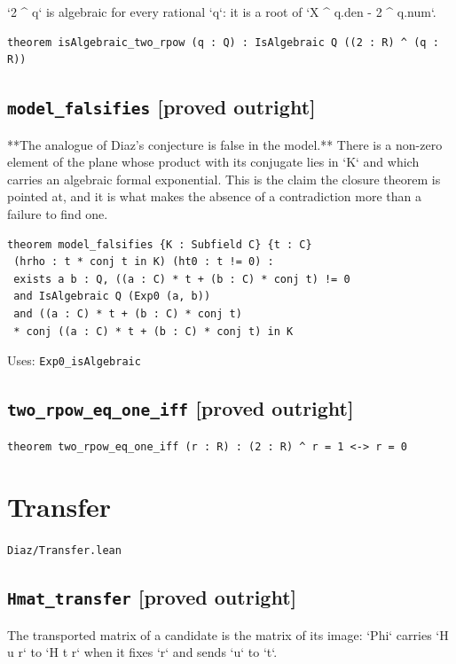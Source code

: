 \documentclass[11pt,a4paper]{article}
\newcommand{\tagpr}{\textcolor{provedc}{\textbf{[proved outright]}}}
\begin{document}
`2 \^{} q` is algebraic for every rational `q`: it is a root of `X \^{} q.den - 2 \^{} q.num`.

\begin{lstlisting}
theorem isAlgebraic_two_rpow (q : Q) : IsAlgebraic Q ((2 : R) ^ (q : R))
\end{lstlisting}

\subsection*{\texttt{model\_falsifies} \hfill \tagpr}

**The analogue of Diaz's conjecture is false in the model.** There is a non-zero element of the plane whose product with its conjugate lies in `K` and which carries an algebraic formal exponential. This is the claim the closure theorem is pointed at, and it is what makes the absence of a contradiction more than a failure to find one.

\begin{lstlisting}
theorem model_falsifies {K : Subfield C} {t : C}
 (hrho : t * conj t in K) (ht0 : t != 0) :
 exists a b : Q, ((a : C) * t + (b : C) * conj t) != 0
 and IsAlgebraic Q (Exp0 (a, b))
 and ((a : C) * t + (b : C) * conj t)
 * conj ((a : C) * t + (b : C) * conj t) in K
\end{lstlisting}
\noindent\footnotesize Uses: \texttt{Exp0\_isAlgebraic}\normalsize


\subsection*{\texttt{two\_rpow\_eq\_one\_iff} \hfill \tagpr}
\begin{lstlisting}
theorem two_rpow_eq_one_iff (r : R) : (2 : R) ^ r = 1 <-> r = 0
\end{lstlisting}

\section{Transfer}
\noindent\texttt{Diaz/Transfer.lean}


\subsection*{\texttt{Hmat\_transfer} \hfill \tagpr}

The transported matrix of a candidate is the matrix of its image: `Phi` carries `H u r` to `H t r` when it fixes `r` and sends `u` to `t`.
\end{document}
